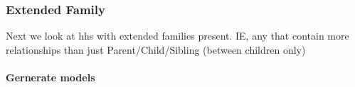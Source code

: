 \documentclass[
]{book}
\newenvironment{Shaded}{\begin{snugshade}}{\end{snugshade}}
\newcommand{\AttributeTok}[1]{\textcolor[rgb]{0.77,0.63,0.00}{#1}}
\newcommand{\ConstantTok}[1]{\textcolor[rgb]{0.00,0.00,0.00}{#1}}
\newcommand{\DecValTok}[1]{\textcolor[rgb]{0.00,0.00,0.81}{#1}}
\newcommand{\FunctionTok}[1]{\textcolor[rgb]{0.00,0.00,0.00}{#1}}
\newcommand{\NormalTok}[1]{#1}
\newcommand{\OtherTok}[1]{\textcolor[rgb]{0.56,0.35,0.01}{#1}}
\newcommand{\SpecialCharTok}[1]{\textcolor[rgb]{0.00,0.00,0.00}{#1}}
\newcommand{\StringTok}[1]{\textcolor[rgb]{0.31,0.60,0.02}{#1}}
\begin{document}
\begin{Shaded}
\end{Shaded}

\hypertarget{extended-family}{%
\subsubsection{Extended Family}\label{extended-family}}

Next we look at hhs with extended families present. IE, any that contain more relationships than just Parent/Child/Sibling (between children only)

\hypertarget{gernerate-models}{%
\paragraph{Gernerate models}\label{gernerate-models}}
\end{document}
